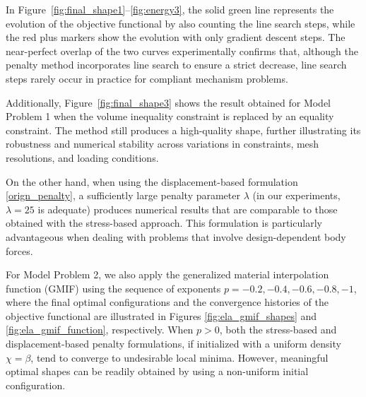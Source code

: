 \documentclass{amsart}
\begin{document}
In Figure~\ref{fig:final_shape1}--\ref{fig:energy3}, the solid green line represents the evolution of the objective functional by also counting the line search steps, while the red plus markers show the evolution with only gradient descent steps. The near-perfect overlap of the two curves experimentally confirms that, although the penalty method incorporates line search to ensure a strict decrease, line search steps rarely occur in practice for compliant mechanism problems.

Additionally, Figure~\ref{fig:final_shape3} shows the result obtained for Model Problem 1 when the volume inequality constraint is replaced by an equality constraint. The method still produces a high-quality shape, further illustrating its robustness and numerical stability across variations in constraints, mesh resolutions, and loading conditions.

On the other hand, when using the displacement-based formulation \eqref{orign_penalty}, a sufficiently large penalty parameter $  \lambda  $ (in our experiments, $  \lambda = 25  $ is adequate) produces numerical results that are comparable to those obtained with the stress-based approach. This formulation is particularly advantageous when dealing with problems that involve design-dependent body forces.

For Model Problem 2, we also apply the generalized material interpolation function (GMIF) using the sequence of exponents $  p = -0.2, -0.4, -0.6, -0.8, -1  $, where the final optimal configurations and the convergence histories of the objective functional are illustrated in  Figures \ref{fig:ela_gmif_shapes} and \ref{fig:ela_gmif_function}, respectively. When \( p > 0 \), both the stress-based and displacement-based penalty formulations, if initialized with a uniform density \(\chi = \beta\), tend to converge to undesirable local minima. However, meaningful optimal shapes can be readily obtained by using a non-uniform initial configuration.
\end{document}
